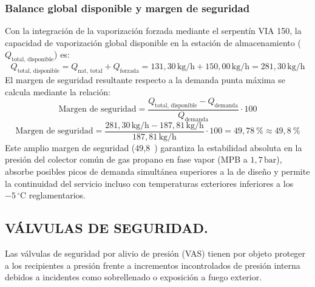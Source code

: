 \documentclass[12pt]{article}
\begin{document}
        \subsubsection{Balance global disponible y margen de seguridad}
        Con la integración de la vaporización forzada mediante el serpentín VIA 150, la capacidad de vaporización global disponible en la estación de almacenamiento ($Q_{\text{total, disponible}}$) es:
        \begin{equation}
            Q_{\text{total, disponible}} = Q_{\text{nat, total}} + Q_{\text{forzada}} = 131,30\,\text{kg/h} + 150,00\,\text{kg/h} = 281,30\,\text{kg/h}
        \end{equation}
        El margen de seguridad resultante respecto a la demanda punta máxima se calcula mediante la relación:
        \begin{equation}
            \text{Margen de seguridad} = \frac{Q_{\text{total, disponible}} - Q_{\text{demanda}}}{Q_{\text{demanda}}} \cdot 100
        \end{equation}
        \begin{equation}
            \text{Margen de seguridad} = \frac{281,30\,\text{kg/h} - 187,81\,\text{kg/h}}{187,81\,\text{kg/h}} \cdot 100 = 49,78\ \text{\%} \approx 49,8\ \text{\%}
        \end{equation}
        Este amplio margen de seguridad (49,8\ \text{\%}) garantiza la estabilidad absoluta en la presión del colector común de gas propano en fase vapor (MPB a $1,7\,\text{bar}$), absorbe posibles picos de demanda simultánea superiores a la de diseño y permite la continuidad del servicio incluso con temperaturas exteriores inferiores a los $-5\,^{\circ}\text{C}$ reglamentarios.

        \subsection{VÁLVULAS DE SEGURIDAD.}
        Las válvulas de seguridad por alivio de presión (VAS) tienen por objeto proteger a los recipientes a presión frente a incrementos incontrolados de presión interna debidos a incidentes como sobrellenado o exposición a fuego exterior.
\end{document}
